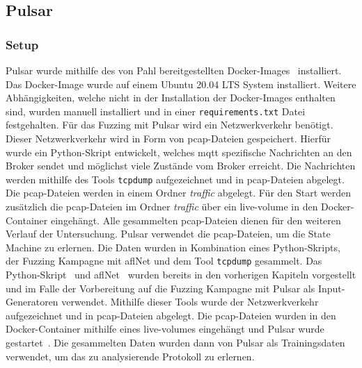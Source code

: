 
\subsection{Pulsar}\label{subsec:pulsar}
\subsubsection{Setup}
Pulsar wurde mithilfe des von Pahl bereitgestellten Docker-Images~\cite{pulsar-docker} installiert.
Das Docker-Image wurde auf einem Ubuntu 20.04 LTS System installiert.
Weitere Abhängigkeiten, welche nicht in der Installation der Docker-Images enthalten sind, wurden manuell installiert und
in einer \texttt{requirements.txt} Datei festgehalten.
Für das Fuzzing mit Pulsar wird ein Netzwerkverkehr benötigt.
Dieser Netzwerkverkehr wird in Form von \gls{pcap}-Dateien gespeichert.
Hierfür wurde ein Python-Skript entwickelt, welches \gls{mqtt} spezifische Nachrichten an den Broker sendet und möglichst
viele Zustände vom Broker erreicht.
Die Nachrichten werden mithilfe des Tools \texttt{tcpdump} aufgezeichnet und in \gls{pcap}-Dateien abgelegt.
Die \gls{pcap}-Dateien werden in einem Ordner \textit{traffic} abgelegt.
Für den Start werden zusätzlich die \gls{pcap}-Dateien im Ordner \textit{traffic} über ein live-volume in den
Docker-Container eingehängt.
Alle gesammelten pcap-Dateien dienen für den weiteren Verlauf der Untersuchung.
Pulsar verwendet die \gls{pcap}-Dateien, um die State Machine zu erlernen.\newline\newline
Die Daten wurden in Kombination eines Python-Skripts, der Fuzzing Kampagne mit \gls{afl}Net und dem Tool
\texttt{tcpdump} gesammelt.
Das Python-Skript~\cite{python-script-input-generation} und \gls{afl}Net~\cite{aflnet-capture-traffic} wurden bereits in den vorherigen Kapiteln vorgestellt und im Falle der Vorbereitung
auf die Fuzzing Kampagne mit Pulsar als Input-Generatoren verwendet.
Mithilfe dieser Tools wurde der Netzwerkverkehr aufgezeichnet und in \gls{pcap}-Dateien abgelegt.
Die \gls{pcap}-Dateien wurden in den Docker-Container mithilfe eines live-volumes eingehängt und Pulsar wurde gestartet~\cite{run-pulsar}.
Die gesammelten Daten wurden dann von Pulsar als Trainingsdaten verwendet, um das zu analysierende Protokoll zu erlernen.
